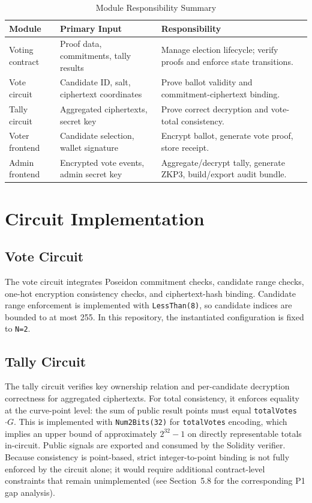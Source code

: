 \begin{table}[htbp]
\centering
\small
\caption{Module Responsibility Summary}
\label{tab:module-responsibility}
\begin{tabular}{L{3.0cm} L{4.0cm} L{5.8cm}}
\toprule
Module & Primary Input & Responsibility \\
\midrule
Voting contract & Proof data, commitments, tally results & Manage election lifecycle; verify proofs and enforce state transitions. \\
Vote circuit & Candidate ID, salt, ciphertext coordinates & Prove ballot validity and commitment-ciphertext binding. \\
Tally circuit & Aggregated ciphertexts, secret key & Prove correct decryption and vote-total consistency. \\
Voter frontend & Candidate selection, wallet signature & Encrypt ballot, generate vote proof, store receipt. \\
Admin frontend & Encrypted vote events, admin secret key & Aggregate/decrypt tally, generate ZKP3, build/export audit bundle. \\
\bottomrule
\end{tabular}
\end{table}

\section{Circuit Implementation}

\subsection{Vote Circuit}

The vote circuit integrates Poseidon commitment checks, candidate range checks, one-hot encryption consistency checks, and ciphertext-hash binding. Candidate range enforcement is implemented with \texttt{LessThan(8)}, so candidate indices are bounded to at most 255. In this repository, the instantiated configuration is fixed to \texttt{N=2}.

\subsection{Tally Circuit}

The tally circuit verifies key ownership relation and per-candidate decryption correctness for aggregated ciphertexts. For total consistency, it enforces equality at the curve-point level: the sum of public result points must equal \texttt{totalVotes} $\cdot G$. This is implemented with \texttt{Num2Bits(32)} for \texttt{totalVotes} encoding, which implies an upper bound of approximately $2^{32}-1$ on directly representable totals in-circuit. Public signals are exported and consumed by the Solidity verifier. Because consistency is point-based, strict integer-to-point binding is not fully enforced by the circuit alone; it would require additional contract-level constraints that remain unimplemented (see Section~5.8 for the corresponding P1 gap analysis).

